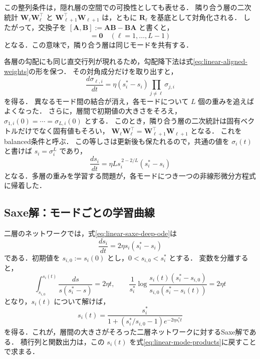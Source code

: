 \documentclass[../main.tex]{subfiles}
\begin{document}
この整列条件は，隠れ層の空間での可換性としても表せる．
隣り合う層の二次統計 $\bm{W}_\ell\bm{W}_\ell^\top$ と
$\bm{W}_{\ell+1}^\top\bm{W}_{\ell+1}$ は，ともに $\bm{R}_\ell$ を基底として対角化される．
したがって，交換子を $[\bm{A},\bm{B}]:=\bm{A}\bm{B}-\bm{B}\bm{A}$ と書くと，
\begin{equation}
  [\bm{W}_\ell\bm{W}_\ell^\top,
  \bm{W}_{\ell+1}^\top\bm{W}_{\ell+1}]=\bm{0}
  \quad(\ell=1,\ldots,L-1)
  \label{eq:linear-adjacent-commutation}
\end{equation}
となる．この意味で，隣り合う層は同じモードを共有する．

各層の勾配にも同じ直交行列が現れるため，勾配降下法は式\eqref{eq:linear-aligned-weights}の形を保つ．
その対角成分だけを取り出すと，
\begin{equation}
  \frac{d\sigma_{\ell,i}}{dt}
  =\eta(s_i^*-s_i)\prod_{j\ne\ell}\sigma_{j,i}
  \label{eq:linear-saxe-layer-ode}
\end{equation}
を得る\cite{saxe2014exact}．
異なるモード間の結合が消え，各モードについて $L$ 個の重みを追えばよくなった．
さらに，層間で初期値の大きさをそろえ，$\sigma_{1,i}(0)=\cdots=\sigma_{L,i}(0)$ とする．
このとき，隣り合う層の二次統計は固有ベクトルだけでなく固有値もそろい，
$\bm{W}_\ell\bm{W}_\ell^\top=\bm{W}_{\ell+1}^\top\bm{W}_{\ell+1}$ となる．
これをbalanced条件と呼ぶ．
この等しさは更新後も保たれるので，共通の値を $\sigma_i(t)$ と書けば $s_i=\sigma_i^L$ であり，
\begin{equation}
  \frac{ds_i}{dt}
  =\eta L s_i^{\,2-2/L}(s_i^*-s_i)
  \label{eq:linear-saxe-deep-ode}
\end{equation}
となる．多層の重みを学習する問題が，各モードにつき一つの非線形微分方程式に帰着した．

\subsection{Saxe解：モードごとの学習曲線}

二層のネットワークでは，式\eqref{eq:linear-saxe-deep-ode}は
\begin{equation}
  \frac{ds_i}{dt}=2\eta s_i(s_i^*-s_i)
  \label{eq:linear-saxe-two-layer-ode}
\end{equation}
である．初期値を $s_{i,0}:=s_i(0)$ とし，$0<s_{i,0}<s_i^*$ とする．
変数を分離すると，
\begin{equation}
  \int_{s_{i,0}}^{s_i(t)}\frac{ds}{s(s_i^*-s)}=2\eta t,
  \qquad
  \frac1{s_i^*}\log\frac{s_i(t)(s_i^*-s_{i,0})}{s_{i,0}(s_i^*-s_i(t))}
  =2\eta t
\end{equation}
となり，$s_i(t)$ について解けば，
\begin{equation}
  s_i(t)
  =\frac{s_i^*}{1+(s_i^*/s_{i,0}-1)e^{-2\eta s_i^* t}}
  \label{eq:linear-saxe-solution}
\end{equation}
を得る．これが，層間の大きさがそろった二層ネットワークに対するSaxe解である．
積行列と関数出力は，この $s_i(t)$ を式\eqref{eq:linear-mode-products}に戻すことで求まる．
\end{document}

